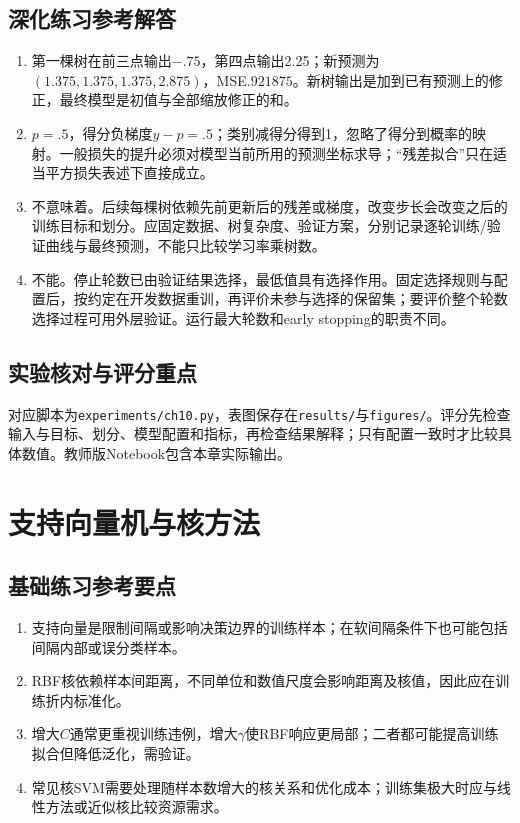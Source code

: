 \section*{深化练习参考解答}
\begin{enumerate}[label=D\arabic*.]
\item 第一棵树在前三点输出$-.75$，第四点输出2.25；新预测为$(1.375,1.375,1.375,2.875)$，MSE$.921875$。新树输出是加到已有预测上的修正，最终模型是初值与全部缩放修正的和。
\item $p=.5$，得分负梯度$y-p=.5$；类别减得分得到1，忽略了得分到概率的映射。一般损失的提升必须对模型当前所用的预测坐标求导；“残差拟合”只在适当平方损失表述下直接成立。
\item 不意味着。后续每棵树依赖先前更新后的残差或梯度，改变步长会改变之后的训练目标和划分。应固定数据、树复杂度、验证方案，分别记录逐轮训练/验证曲线与最终预测，不能只比较学习率乘树数。
\item 不能。停止轮数已由验证结果选择，最低值具有选择作用。固定选择规则与配置后，按约定在开发数据重训，再评价未参与选择的保留集；要评价整个轮数选择过程可用外层验证。运行最大轮数和early stopping的职责不同。
\end{enumerate}

\section*{实验核对与评分重点}
对应脚本为\texttt{experiments/ch10.py}，表图保存在\texttt{results/}与\texttt{figures/}。评分先检查输入与目标、划分、模型配置和指标，再检查结果解释；只有配置一致时才比较具体数值。教师版Notebook包含本章实际输出。

\chapter{支持向量机与核方法}
\section*{基础练习参考要点}
\begin{enumerate}[label=\arabic*.]
\item 支持向量是限制间隔或影响决策边界的训练样本；在软间隔条件下也可能包括间隔内部或误分类样本。
\item RBF核依赖样本间距离，不同单位和数值尺度会影响距离及核值，因此应在训练折内标准化。
\item 增大$C$通常更重视训练违例，增大$\gamma$使RBF响应更局部；二者都可能提高训练拟合但降低泛化，需验证。
\item 常见核SVM需要处理随样本数增大的核关系和优化成本；训练集极大时应与线性方法或近似核比较资源需求。
\end{enumerate}
